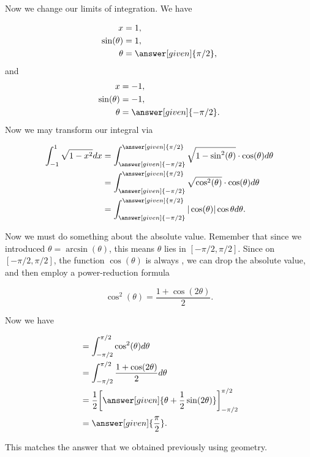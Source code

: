 \documentclass{ximera}
\begin{document}
\begin{example}
\begin{explanation}
   Now we change our limits of
    integration. We have 

    \begin{align*}
      x &= 1,\\
      \sin(\theta) &= 1,\\
      \theta &= \answer[given]{\pi/2},
    \end{align*}
    and
    \begin{align*}
      x &= -1,\\
      \sin(\theta) &= -1,\\
      \theta &= \answer[given]{-\pi/2}.
    \end{align*}
    Now we may transform our integral via
   





    \begin{align*}
      \int_{-1}^1\sqrt{1-x^2} dx &= \int_{\answer[given]{-\pi/2}}^{\answer[given]{\pi/2}} \sqrt{1-\sin^2(\theta)} \cdot \cos(\theta) d\theta \\
      &= \int_{\answer[given]{-\pi/2}}^{\answer[given]{\pi/2}} \sqrt{\cos^2(\theta)}\cdot \cos(\theta) d\theta \\
      &=\int_{\answer[given]{-\pi/2}}^{\answer[given]{\pi/2}} |\cos(\theta)| \cos\theta d\theta.
    \end{align*}
    
Now we must do something about the absolute value. Remember that since we 
introduced $\theta=\arcsin(\theta)$, this means $\theta$ lies in $[- \pi/2, \pi/2 ]$. 
Since on $[-\pi/2,\pi/2]$, the function $\cos(\theta)$ is always
    ,
    we can drop the absolute value, and then employ a power-reduction
    formula

    \[
    \cos^2(\theta)= \frac{1+\cos(2\theta)}{2}.
    \]

    Now we have

    \begin{align*}
      &= \int_{-\pi/2}^{\pi/2} \cos^2(\theta) d\theta \\
      &= \int_{-\pi/2}^{\pi/2} \frac{1+\cos(2\theta)}{2} d\theta\\
      &= \frac{1}{2} \bigg[\answer[given]{\theta +\frac{1}{2}\sin(2\theta)}\bigg]_{-\pi/2}^{\pi/2}\\
      &=\answer[given]{\frac{\pi}{2}}.
    \end{align*}

    This matches the answer that we obtained previously using geometry. 



\end{explanation}
\end{example}
\end{document}
